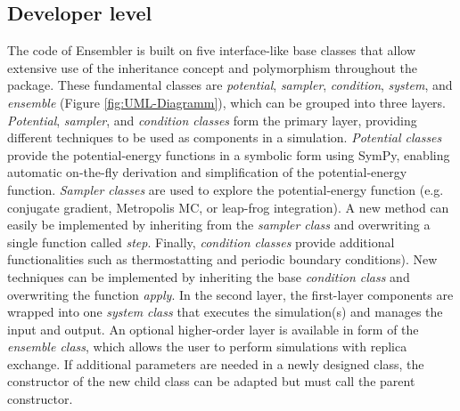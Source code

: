 \subsection{Developer level}
The code of Ensembler is built on five interface-like base classes that allow extensive use of the inheritance concept and polymorphism \cite{Stroustrup1995} throughout the package.
These fundamental classes are \textit{potential}, \textit{sampler}, \textit{condition}, \textit{system}, and \textit{ensemble} (Figure \ref{fig:UML-Diagramm}), which can be grouped into three layers.
\textit{Potential}, \textit{sampler}, and \textit{condition classes} form the primary layer, providing different techniques to be used as components in a simulation. 
\textit{Potential classes} provide the potential-energy functions in a symbolic form using SymPy,\cite{Meurer2017} enabling automatic on-the-fly derivation and simplification of the potential-energy function. 
\textit{Sampler classes} are used to explore the potential-energy function (e.g. conjugate gradient,\cite{Hestenes1952} Metropolis MC,\cite{Hastings1970} or leap-frog\cite{VanGunsteren1988} integration). A new method can easily be implemented by inheriting from the \textit{sampler class} and overwriting a single function called \textit{step}. 
Finally, \textit{condition classes} provide additional functionalities such as thermostatting\cite{Andersen1980} and periodic boundary conditions\cite{Cheatham1995, Leach2001}). New techniques can be implemented by inheriting the base \textit{condition class} and overwriting the function \textit{apply}.
In the second layer, the first-layer components are wrapped into one \textit{system class} that executes the simulation(s) and manages the input and output. 
An optional higher-order layer is available in form of the \textit{ensemble class}, which allows the user to perform simulations with replica exchange.\cite{Sugita1999, Sugita2000, Yamauchi2017, Sidler2016a}
If additional parameters are needed in a newly designed class, the constructor of the new child class can be adapted but must call the parent constructor.
